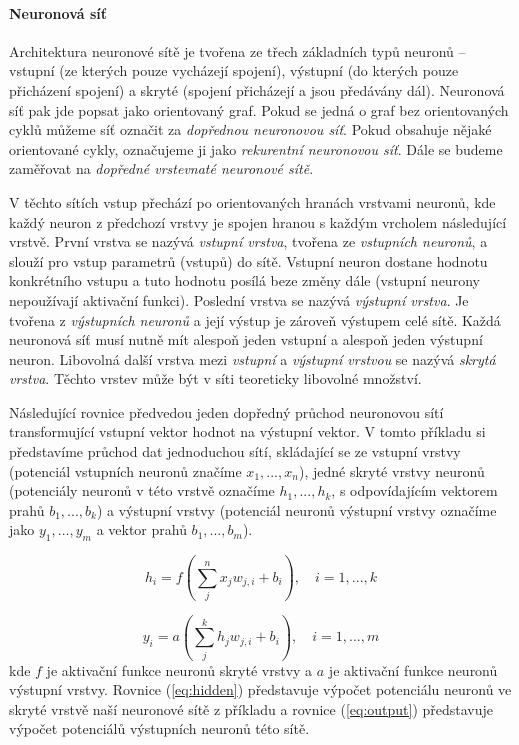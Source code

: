 \paragraph{Neuronová síť}
Architektura neuronové sítě je tvořena ze třech základních typů neuronů --
vstupní (ze kterých pouze vycházejí spojení), výstupní (do kterých pouze
přicházení spojení) a skryté (spojení přicházejí a jsou předávány dál).
Neuronová síť pak jde popsat jako orientovaný graf. Pokud se jedná o graf bez
orientovaných cyklů můžeme síť označit za \emph{dopřednou neuronovou síť}.
Pokud obsahuje nějaké orientované cykly, označujeme ji jako \emph{rekurentní
neuronovou síť}. Dále se budeme zaměřovat na \emph{dopředné vrstevnaté
neuronové sítě}.

V těchto sítích vstup přechází po orientovaných hranách vrstvami neuronů, kde
každý neuron z předchozí vrstvy je spojen hranou s každým vrcholem následující
vrstvě. První vrstva se nazývá \emph{vstupní vrstva}, tvořena ze
\emph{vstupních neuronů}, a slouží pro vstup parametrů (vstupů) do sítě.
Vstupní neuron dostane hodnotu konkrétního vstupu a tuto hodnotu posílá beze
změny dále (vstupní neurony nepoužívají aktivační funkci). Poslední vrstva se
nazývá \emph{výstupní vrstva}. Je tvořena z \emph{výstupních neuronů} a její
výstup je zároveň výstupem celé sítě. Každá neuronová síť musí nutně mít
alespoň jeden vstupní a alespoň jeden výstupní neuron. Libovolná další vrstva
mezi \emph{vstupní} a \emph{výstupní vrstvou} se nazývá \emph{skrytá vrstva}.
Těchto vrstev může být v síti teoreticky libovolné množství.

Následující rovnice předvedou jeden dopředný průchod neuronovou sítí
transformující vstupní vektor hodnot na výstupní vektor. V tomto příkladu si
představíme průchod dat jednoduchou sítí, skládající se ze vstupní vrstvy
(potenciál vstupních neuronů značíme $x_1,...,x_n$), jedné skryté vrstvy
neuronů (potenciály neuronů v této vrstvě označíme $h_1,...,h_k$, s
odpovídajícím vektorem prahů $b_1,...,b_k$) a výstupní vrstvy
(potenciál neuronů výstupní vrstvy označíme jako $y_1,...,y_m$ a vektor prahů
$b_1,...,b_m$).

\begin{equation} \label{eq:hidden}
    h_i = f(\sum_{j}^{n} x_j w_{j,i} + b_i), \quad i = 1,...,k
\end{equation}

\begin{equation} \label{eq:output}
    y_i = a(\sum_{j}^{k} h_j w_{j,i} + b_i), \quad i = 1,...,m
\end{equation}
kde $f$ je aktivační funkce neuronů skryté vrstvy a $a$ je aktivační funkce
neuronů výstupní vrstvy. Rovnice (\ref{eq:hidden}) představuje výpočet potenciálu
neuronů ve skryté vrstvě naší neuronové sítě z příkladu a rovnice
(\ref{eq:output}) představuje výpočet potenciálů výstupních neuronů této sítě.

